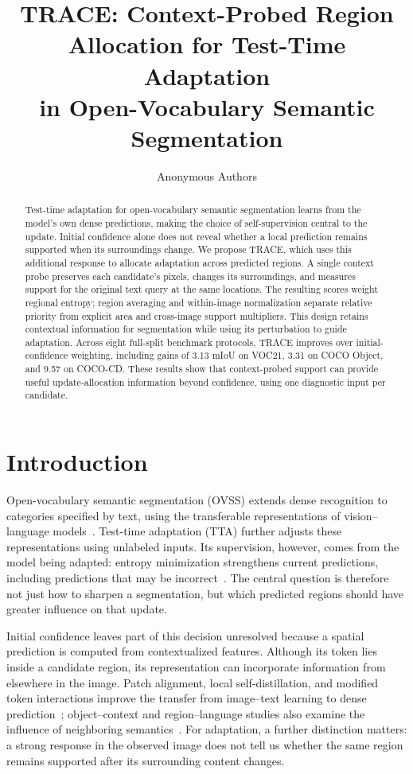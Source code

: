 \documentclass[letterpaper]{article}
\title{TRACE: Context-Probed Region Allocation for Test-Time Adaptation\\in Open-Vocabulary Semantic Segmentation}
\author{Anonymous Authors}
\begin{document}
\raggedbottom
\maketitle

\begin{abstract}
Test-time adaptation for open-vocabulary semantic segmentation learns from the model's own dense predictions, making the choice of self-supervision central to the update. Initial confidence alone does not reveal whether a local prediction remains supported when its surroundings change. We propose TRACE, which uses this additional response to allocate adaptation across predicted regions. A single context probe preserves each candidate's pixels, changes its surroundings, and measures support for the original text query at the same locations. The resulting scores weight regional entropy; region averaging and within-image normalization separate relative priority from explicit area and cross-image support multipliers. This design retains contextual information for segmentation while using its perturbation to guide adaptation. Across eight full-split benchmark protocols, TRACE improves over initial-confidence weighting, including gains of 3.13 mIoU on VOC21, 3.31 on COCO Object, and 9.57 on COCO-CD. These results show that context-probed support can provide useful update-allocation information beyond confidence, using one diagnostic input per candidate.
\end{abstract}

\section{Introduction}
Open-vocabulary semantic segmentation (OVSS) extends dense recognition to categories specified by text, using the transferable representations of vision--language models~\cite{radford2021clip,hajimiri2025naclip}. Test-time adaptation (TTA) further adjusts these representations using unlabeled inputs. Its supervision, however, comes from the model being adapted: entropy minimization strengthens current predictions, including predictions that may be incorrect~\cite{wang2021tent,noori2025mlmp}. The central question is therefore not just how to sharpen a segmentation, but which predicted regions should have greater influence on that update.

Initial confidence leaves part of this decision unresolved because a spatial prediction is computed from contextualized features. Although its token lies inside a candidate region, its representation can incorporate information from elsewhere in the image. Patch alignment, local self-distillation, and modified token interactions improve the transfer from image--text learning to dense prediction~\cite{mukhoti2023pacl,wu2024clipself,shao2024cliptrase}; object--context and region--language studies also examine the influence of neighboring semantics~\cite{kim2025cass,li2025densevlm}. For adaptation, a further distinction matters: a strong response in the observed image does not tell us whether the same region remains supported after its surrounding content changes.
\end{document}
